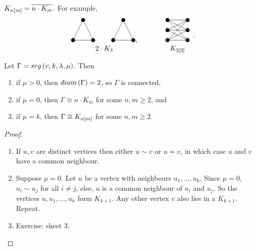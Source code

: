 \begin{note*}
$ K_{n\sbr{m}} = \overline{n \cdot K_m} $. For example,
$$
\begin{array}{ccc}
\begin{tikzpicture}
\fill (0, 0) circle (0.1);
\fill (-0.5, -1) circle (0.1);
\fill (0.5, -1) circle (0.1);
\fill (2, 0) circle (0.1);
\fill (1.5, -1) circle (0.1);
\fill (2.5, -1) circle (0.1);
\draw (0, 0) to (-0.5, -1);
\draw (0, 0) to (0.5, -1);
\draw (-0.5, -1) to (0.5, -1);
\draw (2, 0) to (1.5, -1);
\draw (2, 0) to (2.5, -1);
\draw (1.5, -1) to (2.5, -1);
\end{tikzpicture},
& \qquad &
\begin{tikzpicture}
\fill (0, 0) circle (0.1);
\fill (0, -0.5) circle (0.1);
\fill (0, -1) circle (0.1);
\fill (1, 0) circle (0.1);
\fill (1, -0.5) circle (0.1);
\fill (1, -1) circle (0.1);
\draw (0, 0) to (1, 0);
\draw (0, 0) to (1, -0.5);
\draw (0, 0) to (1, -1);
\draw (0, -0.5) to (1, 0);
\draw (0, -0.5) to (1, -0.5);
\draw (0, -0.5) to (1, -1);
\draw (0, -1) to (1, 0);
\draw (0, -1) to (1, -0.5);
\draw (0, -1) to (1, -1);
\end{tikzpicture}
\\
2 \cdot K_3 & & K_{2\sbr{3}}
\end{array}.
$$
\end{note*}

\begin{proposition}
\label{prop:2.2}
Let $ \Gamma = srg\br{v, k, \lambda, \mu} $. Then
\begin{enumerate}
\item if $ \mu > 0 $, then $ diam\br{\Gamma} = 2 $, so $ \Gamma $ is connected,
\item if $ \mu = 0 $, then $ \Gamma \cong n \cdot K_m $ for some $ n, m \ge 2 $, and
\item if $ \mu = k $, then $ \Gamma \cong K_{n\sbr{m}} $ for some $ n, m \ge 2 $.
\end{enumerate}
\end{proposition}

\begin{proof}
\hfill
\begin{enumerate}
\item If $ u, v $ are distinct vertices then either $ u \sim v $ or $ u \nsim v $, in which case $ u $ and $ v $ have a common neighbour.
\item Suppose $ \mu = 0 $. Let $ u $ be a vertex with neighbours $ u_1, \dots, u_k $. Since $ \mu = 0 $, $ u_i \sim u_j $ for all $ i \ne j $, else, $ u $ is a common neighbour of $ u_i $ and $ u_j $. So the vertices $ u, u_1, \dots, u_k $ form $ K_{k + 1} $. Any other vertex $ v $ also lies in a $ K_{k + 1} $. Repeat.
\item Exercise: sheet $ 3 $.
\end{enumerate}
\end{proof}

